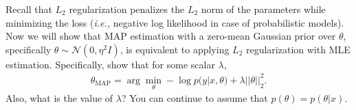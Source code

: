 \item  {} Recall that $L_2$ regularization penalizes the $L_2$ norm
of the parameters while minimizing the loss (\emph{i.e.,} negative log likelihood in case of
probabilistic models).
Now we will show that MAP estimation with a zero-mean
Gaussian prior over $\theta$, specifically $\theta \sim \mathcal{N}(0, \eta^2I)$,
is equivalent to applying $L_2$ regularization with MLE estimation. Specifically,
show that  for some scalar $\lambda$, 
\begin{align}
\theta_{\text{MAP}} = \arg\min_\theta - \log p(y|x,\theta) + \lambda||\theta||^2_2.\label{eqn:1}
\end{align}
Also, what is the value of $\lambda$? You can continue to assume that $p(\theta) = p(\theta | x)$.

